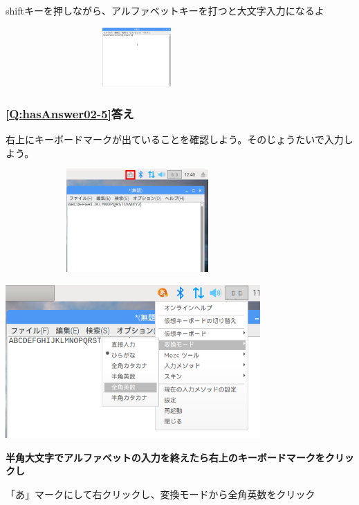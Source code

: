 \documentclass[a4paper,12pt]{jarticle}
\begin{document}
shiftキーを押しながら、アルファベットキーを打つと大文字入力になるよ


\centering
\includegraphics[width=10.031cm,height=2.27cm]{textbook-img217.png}
\flushleft

\clearpage\subsubsection{\bfseries
\ref*{Q:hasAnswer02-5}答え}

右上にキーボードマークが出ていることを確認しよう。そのじょうたいで入力しよう。


\bigskip


\centering
\includegraphics[width=10.075cm,height=3.914cm]{textbook-img218.png}
\flushleft


\bigskip





\centering
\includegraphics[width=9.733cm,height=5.851cm]{textbook-img219.png}
\flushleft


\bigskip

{\bfseries
  半角大文字でアルファベットの入力を終えたら右上のキーボードマークをクリックし

  「あ」マークにして右クリックし、変換モードから全角英数をクリック}
\end{document}
